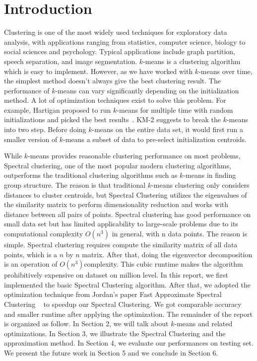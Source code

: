 \documentclass{acm_proc_article-sp}
\begin{document}
\section{Introduction}
Clustering is one of the most widely used techniques for exploratory data analysis,  with applications ranging from statistics, computer science, biology to social sciences and psychology. Typical applications include graph partition, speech separation, and image segmentation. $k$-means is a  
clustering algorithm which is easy to implement. However, as we have worked with $k$-means over time, the simplest method doesn't always give the best clustering result. The performance of $k$-means can vary significantly depending on the initialization method. A lot of optimization techniques exist to solve this problem. For example, Hartigan proposed to run $k$-means for multiple time with random initializations and picked the best results~\cite{hartigan1979algorithm}. KM-2 suggests to break the $k$-means into two step. Before doing $k$-means on the entire data set, it would first run a smaller version of $k$-means a subset of data to pre-select initialization centroids. 

While $k$-means provides reasonable clustering performance on most problems, 
Spectral clustering, one of the most popular modern clustering algorithms, outperforms the traditional clustering algorithms such as $k$-means in finding group structure. The reason is that traditional $k$-means clustering only considers distances to cluster centroids, but Spectral Clustering utilizes the eigenvalues of the similarity matrix to perform dimensionality reduction and works with distance between all pairs of points. Spectral clustering has good performance on small data set but has limited applicability to large-scale problems due to its computational complexity $O(n^3)$ in general, with n data points. The reason is simple. Spectral clustering requires compute the similarity matrix of all data points, which is a $n$ by $n$ matrix. After that, doing the eigenvector decomposition is an operation of 
$O(n^3)$complexity. This cubic runtime makes the algorithm prohibitively expensive on dataset on million level. In this report, we  first implemented the basic Spectral Clustering algorithm. After that, we adopted the optimization technique from Jordan’s paper Fast Approximate Spectral Clustering ~\cite{yan2009fast} to speedup our Spectral Clustering. We got comparable accuracy and smaller runtime after applying the optimization. The remainder of the report is organized as follow. In Section 2, we will talk about $k$-means and related optimizations. In Section 3, we illustrate the Spectral Clustering and the approximation method. In Section 4, we evaluate our performances on testing set. We present the future work in Section 5 and we conclude in Section 6.
\end{document}
